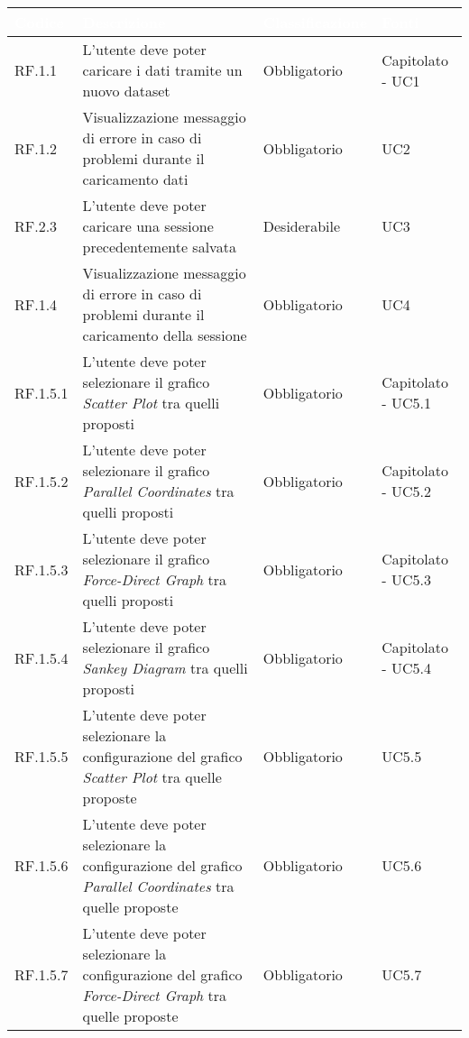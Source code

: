\begin{center}
  \centering
  \begin{longtable}{|L{2cm}|C{5,5cm}|C{3cm}|C{2cm}|}
    \hline
    \textcolor[HTML]{FFFFFF}{\textbf{Codice}} & \textcolor[HTML]{FFFFFF}{\textbf{Descrizione}} & \textcolor[HTML]{FFFFFF}{\textbf{Classificazione}} & \textcolor[HTML]{FFFFFF}{\textbf{Fonti}}
    \\ \hline
    RF.1.1 & L'utente deve poter caricare i dati tramite un nuovo dataset & Obbligatorio & Capitolato - UC1 \\ \hline
    RF.1.2 & Visualizzazione messaggio di errore in caso di problemi durante il caricamento dati & Obbligatorio & UC2 \\ \hline
    RF.2.3 & L'utente deve poter caricare una sessione precedentemente salvata & Desiderabile & UC3 \\ \hline
    RF.1.4 & Visualizzazione messaggio di errore in caso di problemi durante il caricamento della sessione & Obbligatorio & UC4 \\ \hline
    RF.1.5.1 & L'utente deve poter selezionare il grafico \textit{Scatter Plot} tra quelli proposti& Obbligatorio & Capitolato - UC5.1 \\ \hline
    RF.1.5.2 & L'utente deve poter selezionare il grafico \textit{Parallel Coordinates} tra quelli proposti& Obbligatorio & Capitolato - UC5.2 \\ \hline
    RF.1.5.3 & L'utente deve poter selezionare il grafico \textit{Force-Direct Graph} tra quelli proposti& Obbligatorio & Capitolato - UC5.3 \\ \hline
    RF.1.5.4 & L'utente deve poter selezionare il grafico \textit{Sankey Diagram} tra quelli proposti& Obbligatorio & Capitolato - UC5.4 \\ \hline
    RF.1.5.5 & L'utente deve poter selezionare la configurazione del grafico \textit{Scatter Plot} tra quelle proposte& Obbligatorio & UC5.5 \\ \hline
    RF.1.5.6 & L'utente deve poter selezionare la configurazione del grafico \textit{Parallel Coordinates} tra quelle proposte& Obbligatorio & UC5.6 \\ \hline
    RF.1.5.7 & L'utente deve poter selezionare la configurazione del grafico \textit{Force-Direct Graph} tra quelle proposte& Obbligatorio & UC5.7 \\ \hline

\end{longtable}
\end{center}
